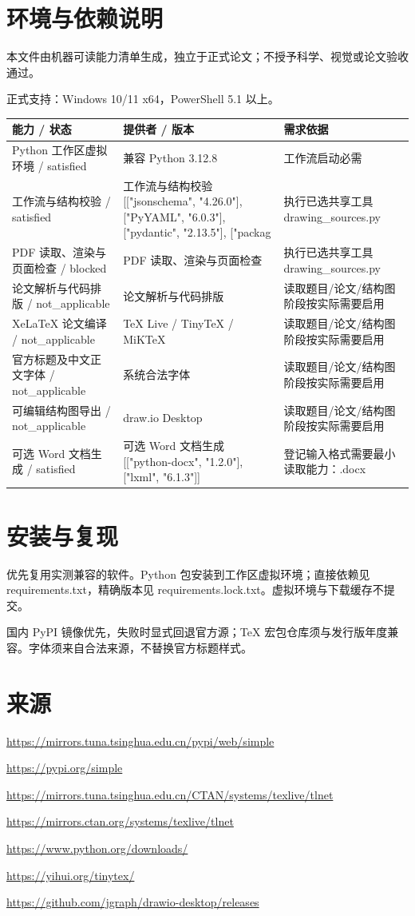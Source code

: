 \documentclass[UTF8,a4paper,10pt]{ctexart}
\begin{document}
\section*{环境与依赖说明}
本文件由机器可读能力清单生成，独立于正式论文；不授予科学、视觉或论文验收通过。
\par 正式支持：Windows 10/11 x64，PowerShell 5.1 以上。
\small
\begin{longtable}{>{\raggedright\arraybackslash}p{.19\linewidth}>{\raggedright\arraybackslash}p{.27\linewidth}>{\raggedright\arraybackslash}p{.43\linewidth}}
\toprule 能力 / 状态 & 提供者 / 版本 & 需求依据 \\ \midrule\endhead
Python 工作区虚拟环境 / satisfied & 兼容 Python 3.12.8 & 工作流启动必需 \\
工作流与结构校验 / satisfied & 工作流与结构校验 [["jsonschema", "4.26.0"], ["PyYAML", "6.0.3"], ["pydantic", "2.13.5"], ["packag & 执行已选共享工具 drawing\_sources.py \\
PDF 读取、渲染与页面检查 / blocked & PDF 读取、渲染与页面检查  & 执行已选共享工具 drawing\_sources.py \\
论文解析与代码排版 / not\_applicable & 论文解析与代码排版  & 读取题目/论文/结构图阶段按实际需要启用 \\
XeLaTeX 论文编译 / not\_applicable & TeX Live / TinyTeX / MiKTeX  & 读取题目/论文/结构图阶段按实际需要启用 \\
官方标题及中文正文字体 / not\_applicable & 系统合法字体  & 读取题目/论文/结构图阶段按实际需要启用 \\
可编辑结构图导出 / not\_applicable & draw.io Desktop  & 读取题目/论文/结构图阶段按实际需要启用 \\
可选 Word 文档生成 / satisfied & 可选 Word 文档生成 [["python-docx", "1.2.0"], ["lxml", "6.1.3"]] & 登记输入格式需要最小读取能力：.docx \\
\bottomrule\end{longtable}
\normalsize\section*{安装与复现}
优先复用实测兼容的软件。Python 包安装到工作区虚拟环境；直接依赖见 requirements.txt，精确版本见 requirements.lock.txt。虚拟环境与下载缓存不提交。
\par 国内 PyPI 镜像优先，失败时显式回退官方源；TeX 宏包仓库须与发行版年度兼容。字体须来自合法来源，不替换官方标题样式。
\section*{来源}
\noindent\url{https://mirrors.tuna.tsinghua.edu.cn/pypi/web/simple}\par
\noindent\url{https://pypi.org/simple}\par
\noindent\url{https://mirrors.tuna.tsinghua.edu.cn/CTAN/systems/texlive/tlnet}\par
\noindent\url{https://mirrors.ctan.org/systems/texlive/tlnet}\par
\noindent\url{https://www.python.org/downloads/}\par
\noindent\url{https://yihui.org/tinytex/}\par
\noindent\url{https://github.com/jgraph/drawio-desktop/releases}\par
\end{document}
